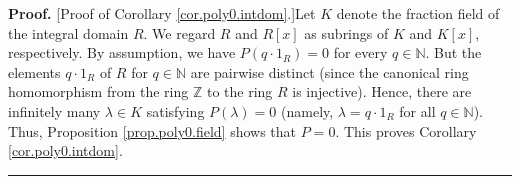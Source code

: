 \documentclass[numbers=enddot,12pt,final,onecolumn,notitlepage]{scrartcl}%
\theoremstyle{definition}
\newenvironment{proof}[1][Proof]{\noindent\textbf{#1.} }{\ \rule{0.5em}{0.5em}}
\newenvironment{vershort}{}{}
\begin{document}
\begin{vershort}
\begin{proof}
[Proof of Corollary \ref{cor.poly0.intdom}.]Let $K$ denote the fraction field
of the integral domain $R$. We regard $R$ and $R\left[  x\right]  $ as
subrings of $K$ and $K\left[  x\right]  $, respectively. By assumption, we
have $P\left(  q\cdot1_{R}\right)  =0$ for every $q\in\mathbb{N}$. But the
elements $q\cdot1_{R}$ of $R$ for $q\in\mathbb{N}$ are pairwise distinct
(since the canonical ring homomorphism from the ring $\mathbb{Z}$ to the ring
$R$ is injective). Hence, there are infinitely many $\lambda\in K$ satisfying
$P\left(  \lambda\right)  =0$ (namely, $\lambda=q\cdot1_{R}$ for all
$q\in\mathbb{N}$). Thus, Proposition \ref{prop.poly0.field} shows that $P=0$.
This proves Corollary \ref{cor.poly0.intdom}.
\end{proof}
\end{vershort}
\end{document}
